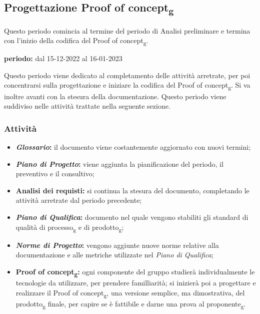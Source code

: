 \subsection{Progettazione Proof of concept\textsubscript{g}}
Questo periodo comincia al termine del periodo di Analisi preliminare e termina con l'inizio della codifica del Proof of concept\textsubscript{g}.\\
\begin{center}
\textbf{periodo:} dal 15-12-2022 al 16-01-2023\\
\end{center}
Questo periodo viene dedicato al completamento delle attività arretrate, per poi concentrarsi sulla 
progettazione e iniziare la codifica del Proof of concept\textsubscript{g}. Si va inoltre avanti con la stesura 
della documentazione. Questo periodo viene suddiviso nelle attività trattate nella seguente sezione.

\subsubsection{Attività}
\begin{itemize}
\item \textbf{\textit{Glossario}:} il documento viene costantemente aggiornato con nuovi termini;
\item \textbf{\textit{Piano di Progetto}:} viene aggiunta la pianificazione del periodo, il preventivo e il consultivo;  
\item \textbf{Analisi dei requisti:} si continua la stesura del documento, completando le attività arretrate dal periodo precedente;
\item \textbf{\textit{Piano di Qualifica}:} documento nel quale vengono stabiliti gli standard di qualità di processo\textsubscript{g} e di prodotto\textsubscript{g};
\item \textbf{\textit{Norme di Progetto}:} vengono aggiunte nuove norme relative alla documentazione e alle metriche utilizzate nel \textit{Piano di Qualifica};
\item \textbf{Proof of concept\textsubscript{g}:} ogni componente del gruppo studierà individualmente le tecnologie da utilizzare, per prendere familliarità; si inizierà poi a progettare e realizzare il Proof of concept\textsubscript{g}, una versione semplice, ma dimostrativa, del prodotto\textsubscript{g} finale, per 
capire se è fattibile e darne una prova al proponente\textsubscript{g}.
\end{itemize}

